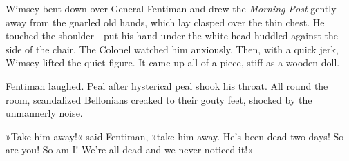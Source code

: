 Wimsey bent down over General Fentiman and drew the \textit{Morning Post} gently away from the gnarled old hands, which lay clasped over the thin chest. He touched the shoulder—put his hand under the white head huddled against the side of the chair. The Colonel watched him anxiously. Then, with a quick jerk, Wimsey lifted the quiet figure. It came up all of a piece, stiff as a wooden doll.

Fentiman laughed. Peal after hysterical peal shook his throat. All round the room, scandalized Bellonians creaked to their gouty feet, shocked by the unmannerly noise.

»Take him away!« said Fentiman, »take him away. He's been dead two days! So are you! So am I! We're all dead and we never noticed it!«